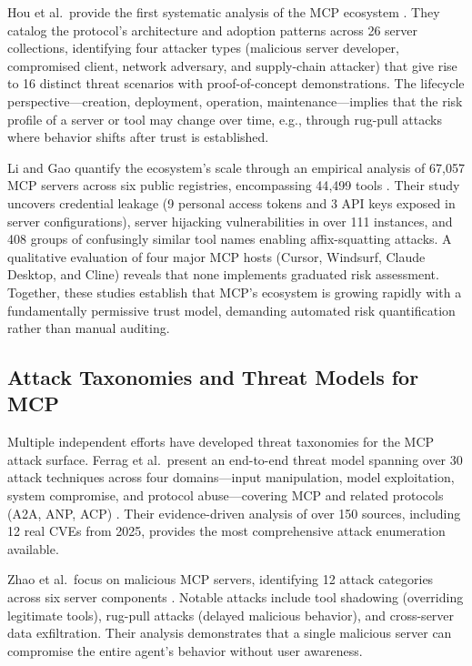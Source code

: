 \documentclass[12pt]{article}
\begin{document}
Hou et al.\ provide the first systematic analysis of the MCP ecosystem \cite{hou2025mcp_landscape}. They catalog the protocol’s architecture and adoption patterns across 26 server collections, identifying four attacker types (malicious server developer, compromised client, network adversary, and supply-chain attacker) that give rise to 16 distinct threat scenarios with proof-of-concept demonstrations. The lifecycle perspective---creation, deployment, operation, maintenance---implies that the risk profile of a server or tool may change over time, e.g., through rug-pull attacks where behavior shifts after trust is established.

Li and Gao quantify the ecosystem’s scale through an empirical analysis of 67{,}057 MCP servers across six public registries, encompassing 44{,}499 tools \cite{li2025understanding_mcp}. Their study uncovers credential leakage (9 personal access tokens and 3 API keys exposed in server configurations), server hijacking vulnerabilities in over 111 instances, and 408 groups of confusingly similar tool names enabling affix-squatting attacks. A qualitative evaluation of four major MCP hosts (Cursor, Windsurf, Claude Desktop, and Cline) reveals that none implements graduated risk assessment. Together, these studies establish that MCP’s ecosystem is growing rapidly with a fundamentally permissive trust model, demanding automated risk quantification rather than manual auditing.

\subsection{Attack Taxonomies and Threat Models for MCP}

Multiple independent efforts have developed threat taxonomies for the MCP attack surface. Ferrag et al.\ present an end-to-end threat model spanning over 30 attack techniques across four domains---input manipulation, model exploitation, system compromise, and protocol abuse---covering MCP and related protocols (A2A, ANP, ACP) \cite{ferrag2025prompt_to_protocol}. Their evidence-driven analysis of over 150 sources, including 12 real CVEs from 2025, provides the most comprehensive attack enumeration available.

Zhao et al.\ focus on malicious MCP servers, identifying 12 attack categories across six server components \cite{zhao2025when_mcp_servers_attack}. Notable attacks include tool shadowing (overriding legitimate tools), rug-pull attacks (delayed malicious behavior), and cross-server data exfiltration. Their analysis demonstrates that a single malicious server can compromise the entire agent’s behavior without user awareness.
\end{document}
